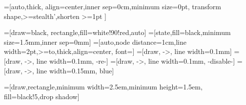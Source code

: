 \usepackage{tikz}
\usetikzlibrary{intersections,patterns,decorations.markings,decorations.pathreplacing,arrows,automata,calc,decorations,fit,positioning,backgrounds}
\usetikzlibrary{positioning}
\usetikzlibrary{fadings}
\usetikzlibrary{arrows,shapes,automata,shadows}
\usetikzlibrary{trees}
\usetikzlibrary{plotmarks}


  
  
=[auto,thick,
  align=center,inner sep=0cm,minimum size=0pt, transform shape,>=stealth',shorten >=1pt
]{}

=[draw=black, rectangle,fill=white!90!red,auto]{}
=[state,fill=black,minimum size=1.5mm,inner sep=0mm]{}
=[auto,node distance=1cm,line width=2pt,>=to,thick,align=center, font=\scriptsize]{}
=[draw, ->, line width=0.1mm]{}
=[draw, ->, line width=0.1mm, -re-]{}
=[draw, ->, line width=0.1mm, -disable-]{}
=[draw, ->, line width=0.15mm, blue]{}

\newcommand{\component}[6]{
  \node[rectangle,draw, fill=white] (#1) #3 [#2] {
  	#5
    \begin{tikzpicture}[component]
      \tikzset{
      place/.style={state,fill=white!89!black,draw=white!50!black,minimum size=0.75cm,inner sep=0.0cm},
    }
      #4
    \end{tikzpicture}
     #6   
  }
}

=[draw,rectangle,minimum width=2.5em,minimum height=1.5em, fill=black!5,drop shadow]


\newcommand{\sendToken}{\ensuremath{\mathit{STT}}}
\newcommand{\rcvToken}{\ensuremath{\mathit{RTT}}}
\newcommand{\sendRequest}{\ensuremath{\mathit{SR}}}
\newcommand{\rcvRequest}{\ensuremath{\mathit{RR}}}
\newcommand{\sendGrant}{\ensuremath{\mathit{STC}}}
\newcommand{\rcvGrant}{\ensuremath{\mathit{RG}}}
\newcommand{\releaseAll}{\ensuremath{\mathit{rel}}}
\newcommand{\sendTokenResource}{\ensuremath{\mathit{STR}}}
\newcommand{\sendTokenToken}{\ensuremath{\mathit{STT}}}
\newcommand{\rcvTokenToken}{\ensuremath{\mathit{RTT}}}
\newcommand{\rcvTokenResource}{\ensuremath{\mathit{RTR}}}
\newcommand{\rcvResource}{\ensuremath{\mathit{done}}}


